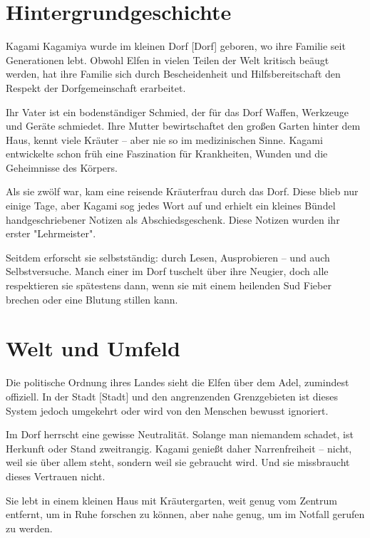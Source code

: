 \documentclass[12pt,a4paper]{article}
\begin{document}
\newpage

\section{Hintergrundgeschichte}

Kagami Kagamiya wurde im kleinen Dorf [Dorf] geboren, wo ihre Familie seit Generationen lebt. Obwohl Elfen in vielen Teilen der Welt kritisch beäugt werden, hat ihre Familie sich durch Bescheidenheit und Hilfsbereitschaft den Respekt der Dorfgemeinschaft erarbeitet. 

Ihr Vater ist ein bodenständiger Schmied, der für das Dorf Waffen, Werkzeuge und Geräte schmiedet. Ihre Mutter bewirtschaftet den großen Garten hinter dem Haus, kennt viele Kräuter – aber nie so im medizinischen Sinne. Kagami entwickelte schon früh eine Faszination für Krankheiten, Wunden und die Geheimnisse des Körpers.

Als sie zwölf war, kam eine reisende Kräuterfrau durch das Dorf. Diese blieb nur einige Tage, aber Kagami sog jedes Wort auf und erhielt ein kleines Bündel handgeschriebener Notizen als Abschiedsgeschenk. Diese Notizen wurden ihr erster "Lehrmeister".

Seitdem erforscht sie selbstständig: durch Lesen, Ausprobieren – und auch Selbstversuche. Manch einer im Dorf tuschelt über ihre Neugier, doch alle respektieren sie spätestens dann, wenn sie mit einem heilenden Sud Fieber brechen oder eine Blutung stillen kann.

\newpage

\section{Welt und Umfeld}

Die politische Ordnung ihres Landes sieht die Elfen über dem Adel, zumindest offiziell. In der Stadt [Stadt] und den angrenzenden Grenzgebieten ist dieses System jedoch umgekehrt oder wird von den Menschen bewusst ignoriert.

Im Dorf herrscht eine gewisse Neutralität. Solange man niemandem schadet, ist Herkunft oder Stand zweitrangig. Kagami genießt daher Narrenfreiheit – nicht, weil sie über allem steht, sondern weil sie gebraucht wird. Und sie missbraucht dieses Vertrauen nicht.

Sie lebt in einem kleinen Haus mit Kräutergarten, weit genug vom Zentrum entfernt, um in Ruhe forschen zu können, aber nahe genug, um im Notfall gerufen zu werden.
\end{document}
